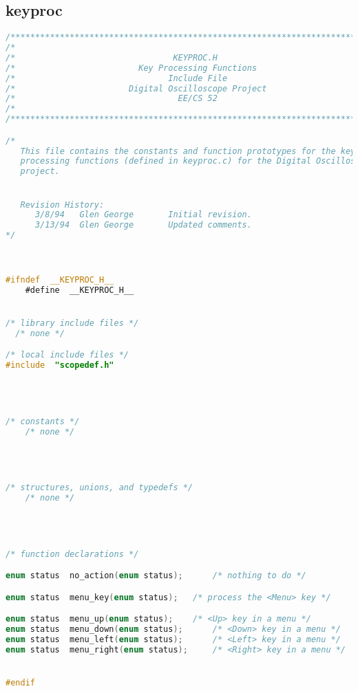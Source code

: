 \subsection{keyproc}
\begin{lstlisting}[language=C]
/****************************************************************************/
/*                                                                          */
/*                                KEYPROC.H                                 */
/*                         Key Processing Functions                         */
/*                               Include File                               */
/*                       Digital Oscilloscope Project                       */
/*                                 EE/CS 52                                 */
/*                                                                          */
/****************************************************************************/

/*
   This file contains the constants and function prototypes for the key
   processing functions (defined in keyproc.c) for the Digital Oscilloscope
   project.


   Revision History:
      3/8/94   Glen George       Initial revision.
      3/13/94  Glen George       Updated comments.
*/



#ifndef  __KEYPROC_H__
    #define  __KEYPROC_H__


/* library include files */
  /* none */

/* local include files */
#include  "scopedef.h"




/* constants */
    /* none */




/* structures, unions, and typedefs */
    /* none */




/* function declarations */

enum status  no_action(enum status);      /* nothing to do */

enum status  menu_key(enum status);	  /* process the <Menu> key */

enum status  menu_up(enum status);	  /* <Up> key in a menu */
enum status  menu_down(enum status);	  /* <Down> key in a menu */
enum status  menu_left(enum status);	  /* <Left> key in a menu */
enum status  menu_right(enum status);	  /* <Right> key in a menu */


#endif
\end{lstlisting}

